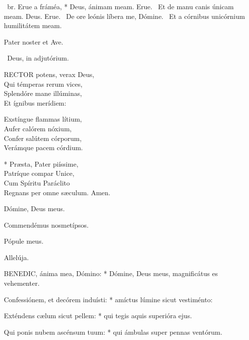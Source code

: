 \R\ br. Erue a fráméa, * Deus, ánimam meam. Erue. \V\ Et de manu canis únicam meam. Deus. Erue. \V\ De ore leónis líbera me, Dómine. \R\ Et a córnibus unicórnium humilitátem meam.



\sectionornament


Pater noster et Ave.

\V\ Deus, in adjutórium.


\lettrine[lines=2]{R}{ECTOR} potens, verax Deus,\\
Qui témperas rerum vices,\\
Splendóre mane illúminas,\\
Et ígnibus merídiem:

Exstíngue flammas lítium,\\
Aufer calórem nóxium,\\
Confer salútem córporum,\\
Verámque pacem córdium.

* Præsta, Pater piíssime,\\
Patríque compar Unice,\\
Cum Spíritu Paráclito\\
Regnans per omne sæculum. Amen.

  Dómine, Deus meus.



 Commendémus nosmetípsos.


 Pópule meus.

  Allelúja.


\lettrine[lines=2]{B}{ENEDIC}, ánima mea, Dómino: * Dómine, Deus meus, magnificátus es vehementer.

Confessiónem, et decórem induísti: * amíctus lúmine sicut vestiménto:

Exténdens cælum sicut pellem: * qui tegis aquis superióra ejus.

Qui ponis nubem ascénsum tuum: * qui ámbulas super pennas ventórum.

